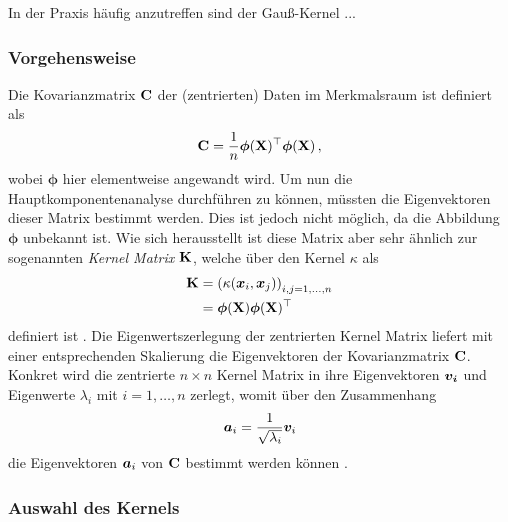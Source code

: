 In der Praxis häufig anzutreffen sind der Gauß-Kernel ...


\subsubsection{Vorgehensweise}
\label{ch:MethodenDerDimRed:statistisch:kPCA:Vorgehensweise}
Die Kovarianzmatrix $\mathbf{C}$ der (zentrierten) Daten im Merkmalsraum ist definiert als
\begin{equation}
	\mathbf{C} = \frac{1}{n} \bm{\phi}(\mathbf{X})^\top \bm{\phi}(\mathbf{X}) \, ,
\end{equation}
wobei $\bm{\phi}$ hier elementweise angewandt wird. Um nun die Hauptkomponentenanalyse durchführen zu können, müssten die Eigenvektoren dieser Matrix bestimmt werden. Dies ist jedoch nicht möglich, da die Abbildung $\bm{\phi}$ unbekannt ist. Wie sich herausstellt ist diese Matrix aber sehr ähnlich zur sogenannten \textit{Kernel Matrix} $\mathbf{K}$, welche über den Kernel $\kappa$ als
\begin{align}
	\mathbf{K} & = \left( \kappa(\bm{x}_i, \bm{x}_j) \right)_{i,j = 1,\ldots,n} \label{eq:kPCA:KernelMatrix_A} \\
	        & = \bm{\phi}(\mathbf{X}) \bm{\phi}(\mathbf{X})^\top \label{eq:kPCA:KernelMatrix_B}
\end{align}
definiert ist \parencite[68]{ShaweTaylor.2011}. Die Eigenwertszerlegung der zentrierten Kernel Matrix liefert mit
einer entsprechenden Skalierung die Eigenvektoren der Kovarianzmatrix $\mathbf{C}$. Konkret wird die
zentrierte $n \times n$ Kernel Matrix in ihre Eigenvektoren $\bm{v_i}$ und Eigenwerte $\lambda_i$
mit $i = 1, \ldots, n$ zerlegt, womit über den Zusammenhang
\begin{equation}
	\label{eq:kPCA:ZusammenhangEigenvektoren}
	\bm{a}_i = \frac{1}{\sqrt{\lambda_i}} \bm{v}_i
\end{equation}
die Eigenvektoren $\bm{a}_i$ von $\mathbf{C}$ bestimmt werden können \parencite[142]{ShaweTaylor.2011}.

\subsubsection{Auswahl des Kernels}
\label{ch:MethodenDerDimRed:statistisch:kPCA:AuswahlKF}

